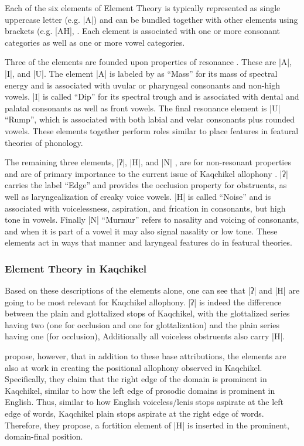 \documentclass[output=paper,colorlinks,citecolor=brown]{langscibook}
\begin{document}
Each of the six elements of Element Theory is typically represented as single uppercase letter (e.g. |A|) and can be bundled together with other elements using brackets (e.g. [AH], \citealt{harris_lindsay_1995}. Each element is associated with one or more consonant categories as well as one or more vowel categories. 

Three of the elements are founded upon properties of resonance \citep{nasukawa_backley_2018}. These are |A|, |I|, and |U|. The element |A| is labeled by \citet{nasukawa_backley_2018} as “Mass” for its mass of spectral energy and is associated with uvular or pharyngeal consonants and non-high vowels. |I| is called “Dip” for its spectral trough and is associated with dental and palatal consonants as well as front vowels. The final resonance element is |U| “Rump”, which is associated with both labial and velar consonants plus rounded vowels. These elements together perform roles similar to place features in featural theories of phonology.

The remaining three elements, |ʔ|, |H|, and |N| ,  are for non-resonant properties and are of primary importance to the current issue of Kaqchikel allophony \citep{nasukawa_backley_2018}. |ʔ| carries the label “Edge” and provides the occlusion property for obstruents, as well as laryngealization of creaky voice vowels. |H| is called “Noise” and is associated with voicelessness, aspiration, and frication in consonants, but high tone in vowels. Finally |N| “Murmur” refers to nasality and voicing of consonants, and when it is part of a vowel it may also signal nasality or low tone. These elements act in ways that manner and laryngeal features do in featural theories.

\subsubsection{Element Theory in Kaqchikel}
Based on these descriptions of the elements alone, one can see that |ʔ| and |H| are going to be most relevant for Kaqchikel allophony. |ʔ| is indeed the difference between the plain and glottalized stops of Kaqchikel, with the glottalized series having two (one for occlusion and one for glottalization) and the plain series having one (for occlusion), Additionally all voiceless obstruents also carry |H|.

\cite{nasukawa_backley_2018} propose, however, that in addition to these base attributions, the elements are also at work in creating the positional allophony observed in Kaqchikel. Specifically, they claim that the right edge of the domain is prominent in Kaqchikel, similar to how the left edge of prosodic domains is prominent in English. Thus, similar to how English voiceless/lenis stops aspirate at the left edge of words, Kaqchikel plain stops aspirate at the right edge of words. Therefore, they propose, a fortition element of |H| is inserted in the prominent, domain-final position.
\end{document}
